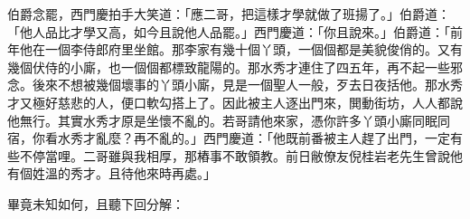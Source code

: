 \begin{showcontents}{}
伯爵念罷，西門慶拍手大笑道：「應二哥，把這樣才學就做了班揚了。」伯爵道：「他人品比才學又高，如今且說他人品罷。」西門慶道：「你且說來。」伯爵道：「前年他在一個李侍郎府里坐館。那李家有幾十個丫頭，一個個都是美貌俊俏的。又有幾個伏侍的小廝，也一個個都標致龍陽的。那水秀才連住了四五年，再不起一些邪念。後來不想被幾個壞事的丫頭小廝，見是一個聖人一般，歹去日夜括他。那水秀才又極好慈悲的人，便口軟勾搭上了。因此被主人逐出門來，閧動街坊，人人都說他無行。其實水秀才原是坐懷不亂的。若哥請他來家，憑你許多丫頭小廝同眠同宿，你看水秀才亂麼？再不亂的。」西門慶道：「他既前番被主人趕了出門，一定有些不停當哩。二哥雖與我相厚，那樁事不敢領教。前日敝僚友倪桂岩老先生曾說他有個姓溫的秀才。且待他來時再處。」

畢竟未知如何，且聽下回分解：




\end{showcontents}


